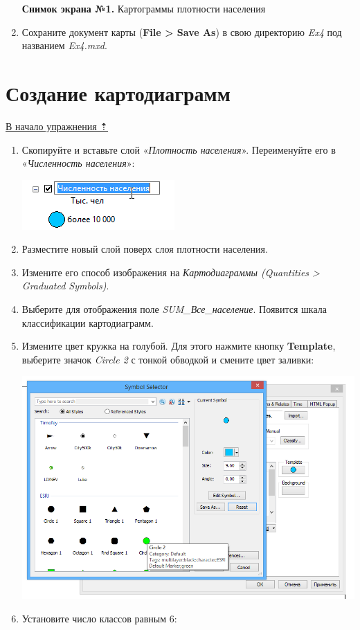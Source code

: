 \documentclass[]{book}
\theoremstyle{definition}
\theoremstyle{definition}
\theoremstyle{definition}
\theoremstyle{remark}
\begin{document}
\begin{enumerate}
  \textbf{Снимок экрана №1.} Картограммы плотности населения
\item
  Сохраните документ карты (\textbf{File \textgreater{} Save As}) в свою
  директорию \emph{Ex4} под названием \emph{Ex4.mxd}.
\end{enumerate}

\hypertarget{map-design-economic-diagrams}{%
\section{Создание картодиаграмм}\label{map-design-economic-diagrams}}

\protect\hyperlink{map-design-economic}{В начало упражнения ⇡}

\begin{enumerate}
\def\labelenumi{\arabic{enumi}.}
\setcounter{enumi}{1}
\item
  Скопируйте и вставьте слой «\emph{Плотность населения}». Переименуйте
  его в «\emph{Численность населения}»:

  \includegraphics{images/Ex04/image17.png}
\item
  Разместите новый слой поверх слоя плотности населения.
\item
  Измените его способ изображения на \emph{Картодиаграммы (Quantities
  \textgreater{} Graduated Symbols)}.
\item
  Выберите для отображения поле \emph{SUM\_Все\_население}. Появится
  шкала классификации картодиаграмм.
\item
  Измените цвет кружка на голубой. Для этого нажмите кнопку
  \textbf{Template}, выберите значок \emph{Circle 2} с тонкой обводкой и
  смените цвет заливки:

  \includegraphics{images/Ex04/image18.png}
\item
  Установите число классов равным 6:


\end{enumerate}
\end{document}
